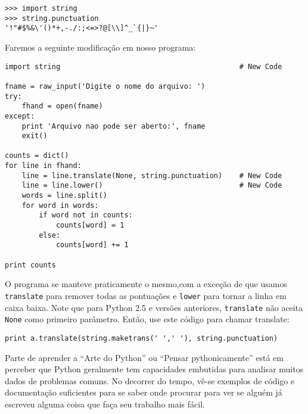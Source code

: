 \beforeverb
\begin{verbatim}
>>> import string
>>> string.punctuation
'!"#$%&\'()*+,-./:;<=>?@[\\]^_`{|}~'
\end{verbatim}
\afterverb
%
Faremos a seguinte modificação em nosso programa:

\beforeverb
\begin{verbatim}
import string                                          # New Code

fname = raw_input('Digite o nome do arquivo: ')
try:
    fhand = open(fname)
except:
    print 'Arquivo nao pode ser aberto:', fname
    exit()

counts = dict()
for line in fhand:
    line = line.translate(None, string.punctuation)    # New Code
    line = line.lower()                                # New Code
    words = line.split()
    for word in words:
        if word not in counts:
            counts[word] = 1
        else:
            counts[word] += 1

print counts
\end{verbatim}
\afterverb
%
O programa se manteve praticamente o mesmo,com a exceção de que usamos {\tt translate} para remover todas as pontuações e {\tt lower} para tornar a linha em caixa baixa.
Note que para Python 2.5 e versões anteriores, {\tt translate} não aceita {\tt None} como primeiro parâmetro. Então, use este código para chamar translate:

\beforeverb
\begin{verbatim}
print a.translate(string.maketrans(' ',' '), string.punctuation)
\end{verbatim}
\afterverb
%
Parte de aprender a ``Arte do Python'' ou ``Pensar pythonicamente'' está em
perceber que Python geralmente tem capacidades embutidas para analisar muitos
dados de problemas comuns. No decorrer do tempo, vê-se exemplos de código e
documentação suficientes para se saber onde procurar para ver se alguém já escreveu alguma coisa que faça seu trabalho mais fácil.

